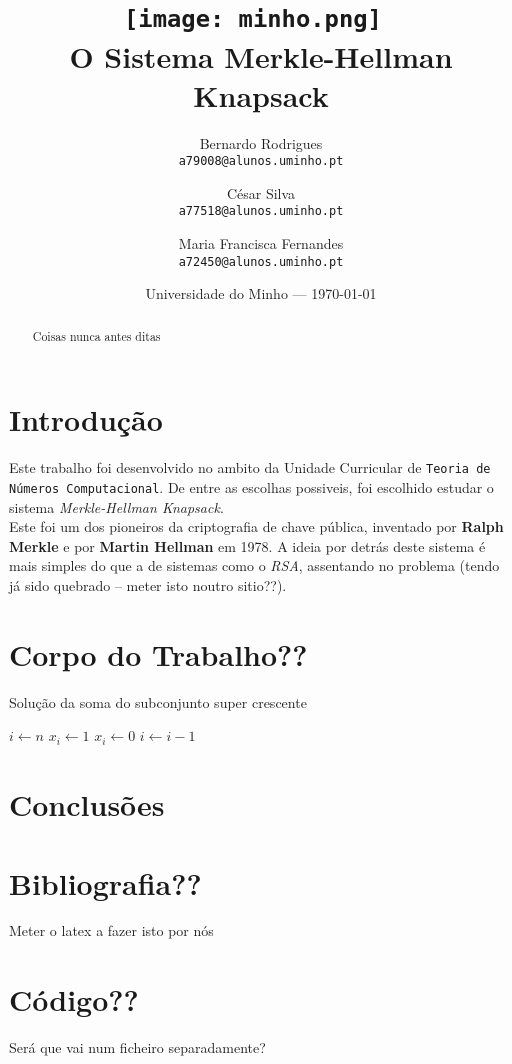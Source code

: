 \documentclass[11pt]{report}
\begin{document}
\title{\texttt{[image: minho.png]}~\\[1cm] O Sistema Merkle-Hellman Knapsack}

\author{Bernardo Rodrigues\\ \texttt{a79008@alunos.uminho.pt}\\ \and César Silva\\ \texttt{a77518@alunos.uminho.pt}\\ \and Maria Francisca Fernandes\\ \texttt{a72450@alunos.uminho.pt}\\}

\date{Universidade do Minho --- \today}

\maketitle

\tableofcontents

\begin{abstract}

	Coisas nunca antes ditas

\end{abstract}

\chapter{Introdução}

Este trabalho foi desenvolvido no ambito da Unidade Curricular de \texttt{Teoria de Números Computacional}. De entre as escolhas possiveis, foi escolhido estudar o sistema \textit{Merkle-Hellman Knapsack}. \\
Este foi um dos pioneiros da criptografia de chave pública, inventado por \textbf{Ralph Merkle} e por \textbf{Martin Hellman} em 1978.
A ideia por detrás deste sistema é mais simples do que a de sistemas como o \textit{RSA}, assentando no problema  (tendo já sido quebrado -- meter isto noutro sitio??).

\chapter{Corpo do Trabalho??}

\begin{algorithm}
	\caption{Solução da soma do subconjunto super crescente}
	\begin{algorithmic}[1]
		\State $i \gets n$
				\State $x_i \gets 1$
			\Else
				\State $x_i \gets 0 $
			\EndIf
		\State $i \gets i - 1$
		\EndWhile
\end{algorithmic}
\end{algorithm}


\chapter{Conclusões}

\chapter{Bibliografia??}

Meter o latex a fazer isto por nós

\appendix

\chapter{Código??}

Será que vai num ficheiro separadamente?
\end{document}
